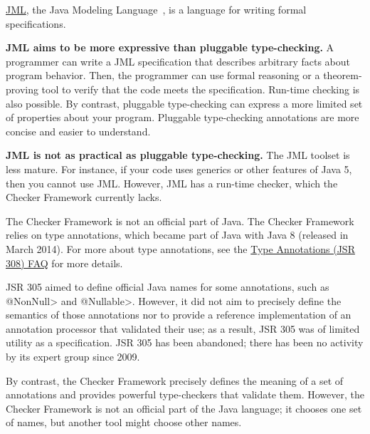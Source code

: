 
\href{http://www.eecs.ucf.edu/~leavens/JML/index.shtml}{JML}, the Java Modeling
Language~\cite{LeavensBR2006:JML}, is a language for writing formal
specifications.

\textbf{JML aims to be more expressive than pluggable type-checking.}
A programmer can write a JML specification that
describes arbitrary facts about program behavior.  Then, the programmer can
use formal reasoning or a theorem-proving tool to verify that the code
meets the specification.  Run-time checking is also possible.
By contrast, pluggable type-checking can express a more limited set of
properties about your program.  Pluggable type-checking annotations are
more concise and easier to understand.

\textbf{JML is not as practical as pluggable type-checking.}
The JML toolset is less mature.  For instance, if your code uses
generics or other features of Java 5, then you cannot use JML.
However, JML has a run-time checker, which the Checker Framework currently
lacks.



The Checker Framework is not an official part of Java.
The Checker Framework relies on type annotations, which became part of Java
with Java 8 (released in March 2014).  For more about type annotations, see the
\href{https://checkerframework.org/jsr308/jsr308-faq.html#pluggable-type-checking-in-java}{Type
  Annotations (JSR 308) FAQ} for more details.



JSR 305 aimed to define official Java names for some annotations, such as
\<@NonNull> and \<@Nullable>.  However, it did not aim to precisely define
the semantics of those annotations nor to provide a reference
implementation of an annotation processor that validated their use;
as a result, JSR 305 was of limited utility as a specification.
JSR 305 has been abandoned; there has been
no activity by its expert group since
2009.

By contrast, the Checker Framework precisely defines the meaning of a set
of annotations and provides powerful type-checkers that validate them.
However, the Checker Framework is not an official part of the Java
language; it chooses one set of names, but another tool might choose other
names.

